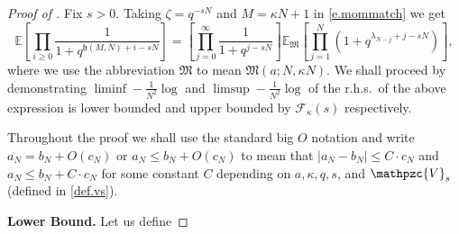 \documentclass[reqno,11pt]{amsart}
\numberwithin{equation}{section}
\theoremstyle{definition}
\begin{document}
\begin{proof}[Proof of ]  Fix $s>0$. 
    Taking $\zeta=q^{-sN}$ and $M=\kappa N+1$ in \eqref{e.mommatch} we get
    \begin{equation*}
        \mathbb{E}\left[\prod_{i\geq 0}\frac{1}{1+q^{\mathfrak{h}(M,N)+i-sN}}\right]=\left[\prod_{j=0}^\infty \frac{1}{1+q^{j-sN}}\right]\mathbb{E}_{\mathfrak{M}}\left[\prod_{j=1}^N(1+q^{\lambda_{N-j}+j-sN})\right],
    \end{equation*}
    where we use the abbreviation $\mathfrak{M}$ to mean $\mathfrak{M}(a;N,\kappa N)$. We shall proceed by demonstrating $\liminf -\frac1{N^2}\log$ and $\limsup -\frac1{ N^2}\log$ of the r.h.s.~of the above expression is lower bounded and upper bounded by $\mathcal{F}_\kappa(s)$ respectively. 
    
    Throughout the proof we shall use the standard  big $O$ notation and write $a_N=b_N+O(c_N)$ or $a_N\le b_N+O(c_N)$ to mean that $|a_N-b_N| \le C\cdot c_N$ and $a_N \le b_N+C\cdot c_N$ for some constant $C$ depending on $a,\kappa, q,s$, and  $\mathpzc{V}_s$ (defined in \eqref{def.vs}).




\medskip

\noindent\textbf{Lower Bound.}  Let us define 


\end{proof}
\end{document}
